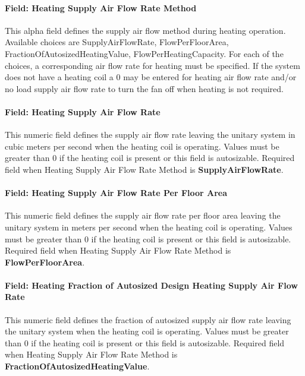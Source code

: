 \paragraph{Field: Heating Supply Air Flow Rate Method}\label{field-heating-supply-air-flow-rate-method-000}

This alpha field defines the supply air flow method during heating operation. Available choices are SupplyAirFlowRate, FlowPerFloorArea, FractionOfAutosizedHeatingValue, FlowPerHeatingCapacity. For each of the choices, a corresponding air flow rate for heating must be specified. If the system does not have a heating coil a 0 may be entered for heating air flow rate and/or no load supply air flow rate to turn the fan off when heating is not required.

\paragraph{Field: Heating Supply Air Flow Rate}\label{field-heating-supply-air-flow-rate-001}

This numeric field defines the supply air flow rate leaving the unitary system in cubic meters per second when the heating coil is operating. Values must be greater than 0 if the heating coil is present or this field is autosizable. Required field when Heating Supply Air Flow Rate Method is \textbf{SupplyAirFlowRate}.

\paragraph{Field: Heating Supply Air Flow Rate Per Floor Area}\label{field-heating-supply-air-flow-rate-per-floor-area}

This numeric field defines the supply air flow rate per floor area leaving the unitary system in meters per second when the heating coil is operating. Values must be greater than 0 if the heating coil is present or this field is autosizable. Required field when Heating Supply Air Flow Rate Method is \textbf{FlowPerFloorArea}.

\paragraph{Field: Heating Fraction of Autosized Design Heating Supply Air Flow Rate}\label{field-heating-fraction-of-autosized-design-heating-supply-air-flow-rate}

This numeric field defines the fraction of autosized supply air flow rate leaving the unitary system when the heating coil is operating. Values must be greater than 0 if the heating coil is present or this field is autosizable. Required field when Heating Supply Air Flow Rate Method is \textbf{FractionOfAutosizedHeatingValue}.

